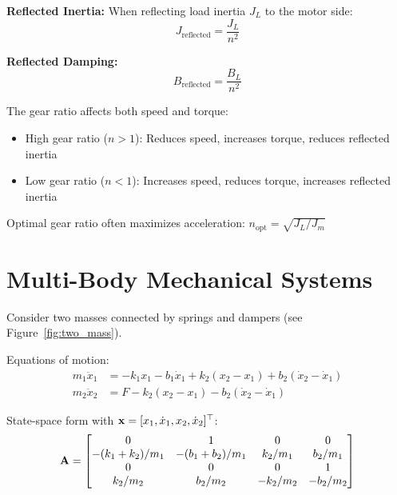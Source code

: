 \textbf{Reflected Inertia:}
When reflecting load inertia $J_L$ to the motor side:
\begin{equation}
J_{\text{reflected}} = \frac{J_L}{n^2}
\end{equation}

\textbf{Reflected Damping:}
\begin{equation}
B_{\text{reflected}} = \frac{B_L}{n^2}
\end{equation}

\begin{keyconceptbox}[title=Gear Ratio Selection]
The gear ratio affects both speed and torque:
\begin{itemize}
    \item High gear ratio ($n > 1$): Reduces speed, increases torque, reduces reflected inertia
    \item Low gear ratio ($n < 1$): Increases speed, reduces torque, increases reflected inertia
\end{itemize}
Optimal gear ratio often maximizes acceleration: $n_{\text{opt}} = \sqrt{J_L/J_m}$
\end{keyconceptbox}

\section{Multi-Body Mechanical Systems}
\label{sec:multibody}



\begin{examplebox}[title=Example 1.5: Two-Mass System]
Consider two masses connected by springs and dampers (see Figure~\ref{fig:two_mass}).

Equations of motion:
\begin{align}
m_1\ddot{x}_1 &= -k_1 x_1 - b_1\dot{x}_1 + k_2(x_2 - x_1) + b_2(\dot{x}_2 - \dot{x}_1) \\
m_2\ddot{x}_2 &= F - k_2(x_2 - x_1) - b_2(\dot{x}_2 - \dot{x}_1)
\end{align}

State-space form with $\mathbf{x} = [x_1, \dot{x}_1, x_2, \dot{x}_2]^\top$:
\begin{equation}
\mathbf{A} = \begin{bmatrix}
0 & 1 & 0 & 0 \\
-(k_1+k_2)/m_1 & -(b_1+b_2)/m_1 & k_2/m_1 & b_2/m_1 \\
0 & 0 & 0 & 1 \\
k_2/m_2 & b_2/m_2 & -k_2/m_2 & -b_2/m_2
\end{bmatrix}
\end{equation}
\end{examplebox}

